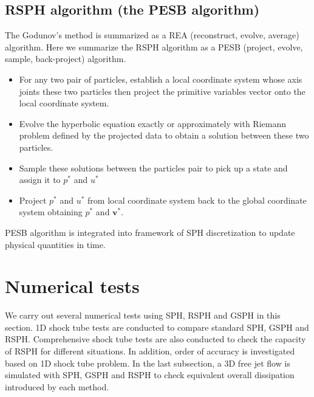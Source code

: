 \documentclass[review]{elsarticle}
\begin{document}

\subsection{RSPH algorithm (the PESB algorithm)}
The Godunov's method is summarized as a REA (reconstruct, evolve, average) algorithm. Here we summarize the RSPH algorithm as a PESB (project, evolve, sample, back-project) algorithm. 
\begin{itemize}
\item For any two pair of particles, establish a local coordinate system whose axis joints these two particles then project the primitive variables vector onto the local coordinate system.
\item Evolve the hyperbolic equation exactly or approximately with Riemann problem defined by the projected data to obtain a solution between these two particles.
\item Sample these solutions between the particles pair to pick up a state and assign it to $p^{\ast}$ and $u^{\ast}$
\item Project $p^{\ast}$ and $u^{\ast}$ from local coordinate system back to the global coordinate system obtaining $p^{\ast}$ and $\textbf{v}^{\ast}$.
\end{itemize}
PESB algorithm is integrated into framework of SPH discretization to update physical quantities in time.

\section{Numerical tests}
We carry out several numerical tests using SPH, RSPH and GSPH in this section.
1D shock tube tests are conducted to compare standard SPH, GSPH and RSPH. Comprehensive shock tube tests are also conducted to check the capacity of RSPH for different situations. In addition, order of accuracy is investigated based on 1D shock tube problem. 
In the last subsection, a 3D free jet flow is simulated with SPH, GSPH and RSPH to check equivalent overall dissipation introduced by each method.
\end{document}
